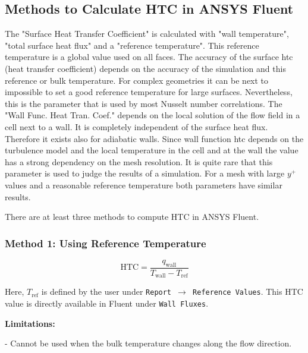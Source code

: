 \documentclass[12pt]{article}
\begin{document}
\subsection{Methods to Calculate HTC in ANSYS Fluent}
The "Surface Heat Transfer Coefficient" is calculated with "wall temperature", "total surface heat flux" and a "reference temperature". This reference temperature is a global value used on all faces. The accuracy of the surface htc (heat transfer coefficient) depends on the accuracy of the simulation and this reference or bulk temperature. For complex geometries it can be next to impossible to set a good reference temperature for large surfaces. Nevertheless, this is the parameter that is used by most Nusselt number correlations. The "Wall Func. Heat Tran. Coef." depends on the local solution of the flow field in a cell next to a wall. It is completely independent of the surface heat flux. Therefore it exists also for adiabatic walls. Since wall function htc depends on the turbulence model and the local temperature in the cell and at the wall the value has a strong dependency on the mesh resolution. It is quite rare that this parameter is used to judge the results of a simulation. For a mesh with large $y^+$ values and a reasonable reference temperature both parameters have similar results.

There are at least three methods to compute HTC in ANSYS Fluent.

\subsubsection{Method 1: Using Reference Temperature}

\begin{equation}
    \text{HTC} = \frac{q_{\text{wall}}}{T_{\text{wall}} - T_{\text{ref}}}
    \label{eq:htc}
\end{equation}

Here, $ T_{\text{ref}} $ is defined by the user under \texttt{Report $\rightarrow$ Reference Values}. This HTC value is directly available in Fluent under \texttt{Wall Fluxes}.

\textbf{Limitations:}
    
- Cannot be used when the bulk temperature changes along the flow direction.
    
\end{document}
